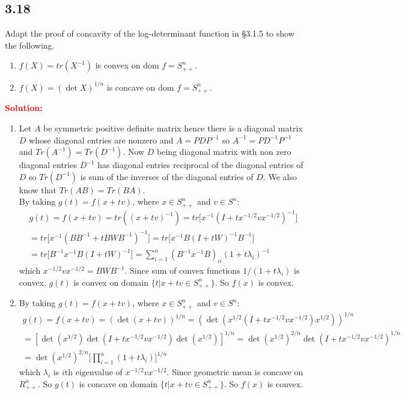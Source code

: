 \begin{latin}

\section{3.18}
Adapt the proof of concavity of the log-determinant function in §3.1.5 to show the following.
\begin{enumerate}
	\item $ f(X) = tr (X^{-1}) $ is convex on dom $ f = S^{n}_{++} $.
	\item $ f(X) = (\det X)^{1/n} $ is concave on dom $ f = S^{n}_{++} $.
\end{enumerate}
\textcolor{red}{\textbf{Solution:}}

\begin{enumerate}
	\item Let $ A $ be symmetric positive definite matrix hence there is a diagonal matrix $ D $ whose diagonal entries are nonzero and $ A=PDP^{-1} $ so $ A^{-1}=PD^{-1}P^{-1} $ and $ Tr(A^{-1})=Tr(D^{-1}) $. Now $ D $ being diagonal matrix with non zero diagonal entries $ D^{-1} $ has diagonal entries reciprocal of the diagonal entries of $ D $ so $ Tr(D^{-1}) $ is sum of the inverses of the diagonal entries of $ D $. We also know that $ Tr(AB)=Tr(BA) $.
	\\
	By taking $ g(t) = f(x + tv ) $, where $ x \in S^{n}_{++} $ and $ v \in S^{n} $:
	\begin{gather*}
		g(t) = f(x+tv) = tr((x+tv)^{-1}) = tr\big[x^{-1} (I + t x^{-1/2}vx^{-1/2})^{-1}\big]
		\\
	   = tr\big[x^{-1} (B B^{-1} + t B W B^{-1})^{-1}\big] = tr\big[x^{-1} B(I+t W)^{-1}B^{-1}\big]
	   \\
	   = tr\big[B^{-1} x^{-1} B(I+t W)^{-1}\big] = \sum_{i=1}^{n} (B^{-1} x^{-1} B)_{ii} (1+t \lambda_{i})^{-1}
	\end{gather*}
	which $ x^{-1/2}vx^{-1/2} = B W B^{-1}$. Since sum of convex functions $ 1/(1 + t\lambda_{i}) $ is convex, $ g(t) $ is convex on domain $ \{ t | x+tv \in S^{n}_{++} \} $. So $ f(x) $ is convex.
	\item By taking $ g(t) = f(x + tv ) $, where $ x \in S^{n}_{++} $ and $ v \in S^{n} $:
	\begin{gather*}
		g(t) = f(x+tv) = (\det (x+tv))^{1/n} = (\det (x^{1/2} (I + t x^{-1/2}vx^{-1/2}) x^{1/2} ))^{1/n} 
		\\
		= [\det(x^{1/2}) \det(I + t x^{-1/2}vx^{-1/2}) \det(x^{1/2})]^{1/n} = \det(x^{1/2})^{2/n} \det(I + t x^{-1/2}vx^{-1/2})^{1/n} 
		\\
		= \det(x^{1/2})^{2/n} \big[\prod_{i=1}^{n} (1 + t \lambda_{i})\big]^{1/n} 
	\end{gather*}
	which $ \lambda_{i} $ is $ i $th eigenvalue of $ x^{-1/2}vx^{-1/2} $. Since geometric mean is concave on $ R^{n}_{++} $. So $ g(t) $ is concave on domain $ \{ t | x+tv \in S^{n}_{++} \} $. So $ f(x) $ is convex.
\end{enumerate}

\end{latin}